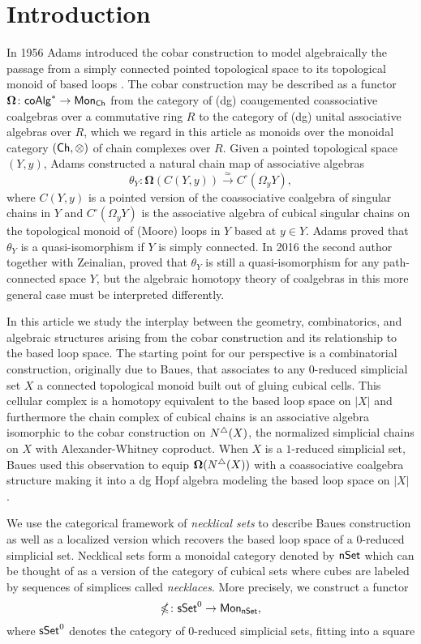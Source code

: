 
\section{Introduction}

In 1956 Adams introduced the cobar construction to model algebraically the passage from a simply connected pointed topological space to its topological monoid of based loops \cite{Adams}. The cobar construction may be described as a functor $\mathbf{\Omega} \colon \mathsf{coAlg}^* \to \mathsf{Mon}_{\mathsf{Ch}}$ from the category of (dg) coaugemented coassociative coalgebras over a commutative ring $R$ to the category of (dg) unital associative algebras over $R$, which we regard in this article as monoids over the monoidal category $(\mathsf{Ch}, \otimes) $ of chain complexes over $R$. Given a pointed topological space $(Y,y)$, Adams constructed a natural chain map of associative algebras
$$\theta_Y \colon \mathbf{\Omega}(C(Y,y)) \xrightarrow{\simeq} C^{\square}(\Omega_yY),$$ where $C(Y,y)$ is a pointed version of the coassociative coalgebra of singular chains in $Y$ and $C^{\square}(\Omega_yY)$ is the associative algebra of cubical singular chains on the topological monoid of (Moore) loops in $Y$ based at $y \in Y$. Adams proved that $\theta_Y$ is a quasi-isomorphism if $Y$ is simply connected. In 2016 the second author together with Zeinalian, proved that $\theta_Y$ is still a quasi-isomorphism for any path-connected space $Y$, but the algebraic homotopy theory of coalgebras in this more general case must be interpreted differently.

In this article we study the interplay between the geometry, combinatorics, and algebraic structures arising from the cobar construction and its relationship to the based loop space. The starting point for our perspective is a combinatorial construction, originally due to Baues, that associates to any $0$-reduced simplicial set $X$ a connected topological monoid built out of gluing cubical cells.  This cellular complex is a homotopy equivalent to the based loop space on $|X|$ and furthermore the chain complex of cubical chains is an associative algebra isomorphic to the cobar construction on $N^{\triangle}(X)$, the normalized simplicial chains on $X$ with Alexander-Whitney coproduct. When $X$ is a $1$-reduced simplicial set, Baues used this observation to equip $\mathbf{\Omega}( N^{\triangle} (X) )$ with a coassociative coalgebra structure making it into a dg Hopf algebra modeling the based loop space on $|X|$ \cite{Baues}. 

We use the categorical framework of \textit{necklical sets} to describe Baues construction as well as a localized version which recovers the based loop space of a $0$-reduced simplicial set. Necklical sets form a monoidal category denoted by $\mathsf{nSet}$ which can be thought of as a version of the category of cubical sets where cubes are labeled by sequences of simplices called \textit{necklaces}. More precisely, we construct a functor $$\mathbb{\Omega} \colon \mathsf{sSet}^0 \to \mathsf{Mon}_{\mathsf{nSet}},$$ where $\mathsf{sSet}^0$ denotes the category of $0$-reduced simplicial sets, fitting into a square

